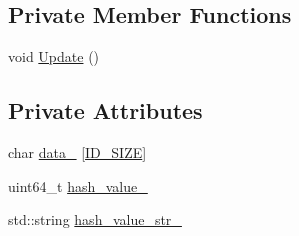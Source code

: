 \subsection*{Private Member Functions}
\begin{DoxyCompactItemize}
\item 
void \hyperlink{classapollo_1_1cyber_1_1transport_1_1Identity_a15caf0a6806581b59c3e29183523cdff}{Update} ()
\end{DoxyCompactItemize}
\subsection*{Private Attributes}
\begin{DoxyCompactItemize}
\item 
char \hyperlink{classapollo_1_1cyber_1_1transport_1_1Identity_a93e404c11841639d4d76365ef7c543a5}{data\-\_\-} \mbox{[}\hyperlink{namespaceapollo_1_1cyber_1_1transport_a5c7448aa493a6ccbc3191720dc7a15ce}{I\-D\-\_\-\-S\-I\-Z\-E}\mbox{]}
\item 
uint64\-\_\-t \hyperlink{classapollo_1_1cyber_1_1transport_1_1Identity_a92061e946f250dba87a7833337d6d5e8}{hash\-\_\-value\-\_\-}
\item 
std\-::string \hyperlink{classapollo_1_1cyber_1_1transport_1_1Identity_af8049eb6984ba84d1651537a9608421a}{hash\-\_\-value\-\_\-str\-\_\-}
\end{DoxyCompactItemize}


